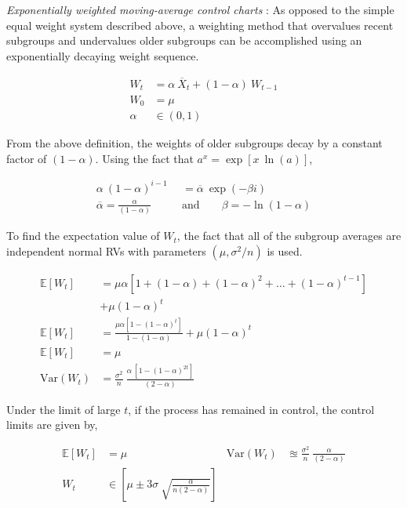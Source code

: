 \textit{Exponentially weighted moving-average control charts} : As opposed to the simple equal weight system described above, a weighting method that overvalues recent subgroups and undervalues older subgroups can be accomplished using an exponentially decaying weight sequence.

\begin{align}
	W_t &= \alpha\ \overline{X}_t + (1 - \alpha)\ W_{t-1} \\
	W_0 &= \mu \\
	\alpha &\in \left(0, 1\right)
\end{align}

From the above definition, the weights of older subgroups decay by a constant factor of $ (1-\alpha) $. Using the fact that $ a^x = \exp \left[x\ \ln (a)\right] $, 

\begin{align}
	\alpha\ (1-\alpha)^{i-1} &= \overline{\alpha}\ \exp(-\beta i) \\
	\overline{\alpha} = \frac{\alpha}{(1 - \alpha)} \qquad &\text{and} \qquad \beta = -\ln(1-\alpha)
\end{align}

To find the expectation value of $ W_t $, the fact that all of the subgroup averages are independent normal RVs with parameters $ (\mu, \sigma^2/n) $ is used. 

\begin{align}
	\mathbb{E}[W_t] &= \mu \alpha \left[1 + (1-\alpha) + (1-\alpha)^2 + \dots + (1-\alpha)^{t-1}\right] \nonumber \\
	& + \mu (1-\alpha)^t \\[1ex]
	\mathbb{E}[W_t] &= \frac{\mu \alpha [1 - (1-\alpha)^t]}{1 - (1 - \alpha)} + \mu (1-\alpha)^t \nonumber \\
	\mathbb{E}[W_t] &= \mu \\
	\mathrm{Var}(W_t) &= \frac{\sigma^2}{n}\ \frac{\alpha\ [1 - (1-\alpha)^{2t}]}{(2 - \alpha)}
\end{align}

Under the limit of large $ t $, if the process has remained in control, the control limits are given by,

\begin{align}
	\mathbb{E}[W_t] &= \mu & \mathrm{Var}(W_t) &\approxeq \frac{\sigma^2}{n}\ \frac{\alpha}{(2-\alpha)}\nonumber \\[1ex]
	W_t &\in \left[\mu \pm 3\sigma\ \sqrt{\frac{\alpha}{n(2-\alpha)}}\right]
\end{align}

